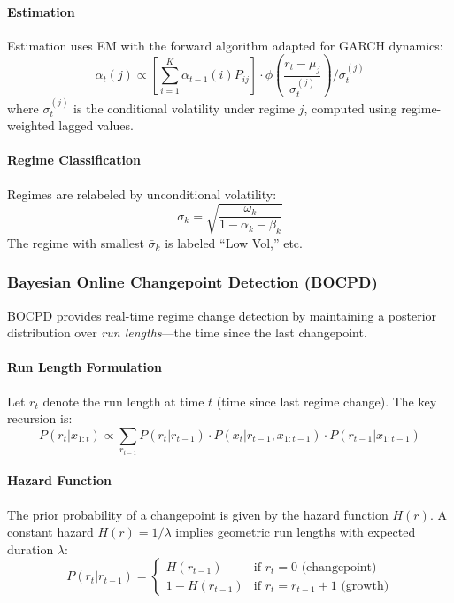 \paragraph{Estimation}

Estimation uses EM with the forward algorithm adapted for GARCH dynamics:
\begin{equation}
  \alpha_t(j) \propto \left[ \sum_{i=1}^{K} \alpha_{t-1}(i) P_{ij} \right] \cdot \phi\left( \frac{r_t - \mu_j}{\sigma_t^{(j)}} \right) / \sigma_t^{(j)}
\end{equation}
where $\sigma_t^{(j)}$ is the conditional volatility under regime $j$, computed using regime-weighted lagged values.

\paragraph{Regime Classification}

Regimes are relabeled by unconditional volatility:
\begin{equation}
  \bar{\sigma}_k = \sqrt{\frac{\omega_k}{1 - \alpha_k - \beta_k}}
\end{equation}
The regime with smallest $\bar{\sigma}_k$ is labeled ``Low Vol,'' etc.

\subsubsection{Bayesian Online Changepoint Detection (BOCPD)}

BOCPD provides real-time regime change detection by maintaining a posterior distribution over \textit{run lengths}---the time since the last changepoint.

\paragraph{Run Length Formulation}

Let $r_t$ denote the run length at time $t$ (time since last regime change). The key recursion is:
\begin{equation}
  P(r_t | x_{1:t}) \propto \sum_{r_{t-1}} P(r_t | r_{t-1}) \cdot P(x_t | r_{t-1}, x_{1:t-1}) \cdot P(r_{t-1} | x_{1:t-1})
\end{equation}

\paragraph{Hazard Function}

The prior probability of a changepoint is given by the hazard function $H(r)$. A constant hazard $H(r) = 1/\lambda$ implies geometric run lengths with expected duration $\lambda$:
\begin{equation}
  P(r_t | r_{t-1}) = \begin{cases}
    H(r_{t-1}) & \text{if } r_t = 0 \text{ (changepoint)} \\
    1 - H(r_{t-1}) & \text{if } r_t = r_{t-1} + 1 \text{ (growth)}
  \end{cases}
\end{equation}

